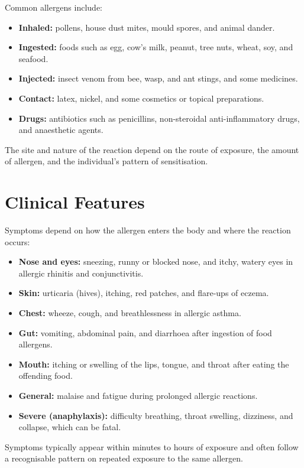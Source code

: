 Common allergens include:

\begin{itemize}
    \item \textbf{Inhaled:} pollens, house dust mites, mould spores, and animal dander.
    \item \textbf{Ingested:} foods such as egg, cow's milk, peanut, tree nuts, wheat, soy, and seafood.
    \item \textbf{Injected:} insect venom from bee, wasp, and ant stings, and some medicines.
    \item \textbf{Contact:} latex, nickel, and some cosmetics or topical preparations.
    \item \textbf{Drugs:} antibiotics such as penicillins, non-steroidal anti-inflammatory drugs, and anaesthetic agents.
\end{itemize}

The site and nature of the reaction depend on the route of exposure, the amount of allergen, and the individual's pattern of sensitisation.

\section*{Clinical Features}
Symptoms depend on how the allergen enters the body and where the reaction occurs:

\begin{itemize}
    \item \textbf{Nose and eyes:} sneezing, runny or blocked nose, and itchy, watery eyes in allergic rhinitis and conjunctivitis.
    \item \textbf{Skin:} urticaria (hives), itching, red patches, and flare-ups of eczema.
    \item \textbf{Chest:} wheeze, cough, and breathlessness in allergic asthma.
    \item \textbf{Gut:} vomiting, abdominal pain, and diarrhoea after ingestion of food allergens.
    \item \textbf{Mouth:} itching or swelling of the lips, tongue, and throat after eating the offending food.
    \item \textbf{General:} malaise and fatigue during prolonged allergic reactions.
    \item \textbf{Severe (anaphylaxis):} difficulty breathing, throat swelling, dizziness, and collapse, which can be fatal.
\end{itemize}

Symptoms typically appear within minutes to hours of exposure and often follow a recognisable pattern on repeated exposure to the same allergen.

